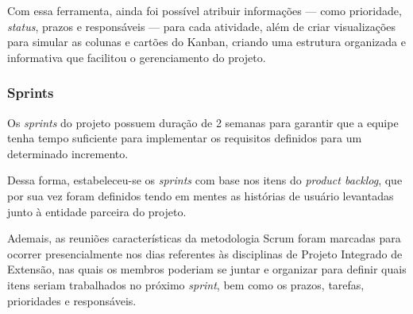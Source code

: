 Com essa ferramenta, ainda foi possível atribuir informações --- como prioridade, \textit{status}, prazos e responsáveis --- para cada atividade, além de criar visualizações para simular as colunas e cartões do Kanban, criando uma estrutura organizada e informativa que facilitou o gerenciamento do projeto.

\subsubsection{Sprints}

Os \textit{sprints} do projeto possuem duração de 2 semanas para garantir que a equipe tenha tempo suficiente para implementar os requisitos definidos para um determinado incremento.

Dessa forma, estabeleceu-se os \textit{sprints} com base nos itens do \textit{product backlog}, que por sua vez foram definidos tendo em mentes as histórias de usuário levantadas junto à entidade parceira do projeto.

Ademais, as reuniões características da metodologia Scrum foram marcadas para ocorrer presencialmente nos dias referentes às disciplinas de Projeto Integrado de Extensão, nas quais os membros poderiam se juntar e organizar para definir quais itens seriam trabalhados no próximo \textit{sprint}, bem como os prazos, tarefas, prioridades e responsáveis. 
